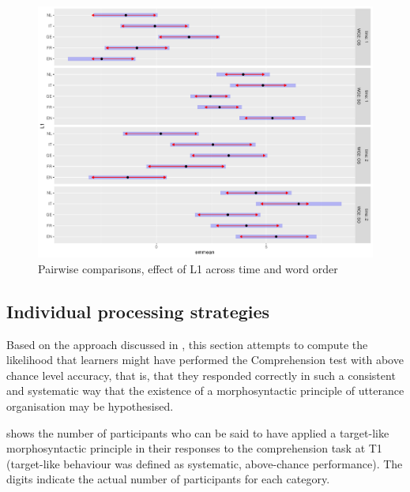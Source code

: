 \begin{figure}
    \includegraphics[width=\textwidth]{figures/05-4.pdf}
    \caption{Pairwise comparisons, effect of L1 across time and word order}
    \label{fig:05:4}
\end{figure}

\subsection{Individual processing strategies}\label{sec:05:2.3}

Based on the approach discussed in , this section attempts to compute the likelihood that learners might have performed the Comprehension test with above chance level accuracy, that is, that they responded correctly in such a consistent and systematic way that the existence of a morphosyntactic principle of utterance organisation may be hypothesised.

 shows the number of participants who can be said to have applied a target-like morphosyntactic principle in their responses to the comprehension task at T1 (target-like behaviour was defined as systematic, above-chance performance). The digits indicate the actual number of participants for each category.

